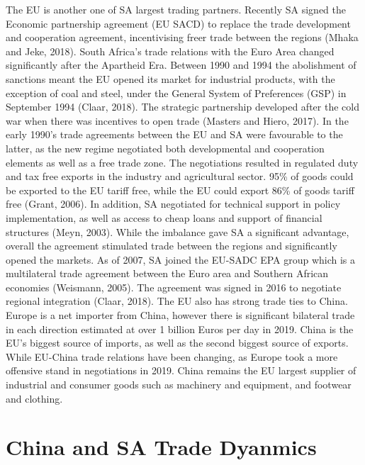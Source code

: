 \documentclass[11pt,preprint, authoryear]{elsarticle}
\numberwithin{equation}{section}
\numberwithin{figure}{section}
\numberwithin{table}{section}
\begin{document}
The EU is another one of SA largest trading partners. Recently SA signed
the Economic partnership agreement (EU SACD) to replace the trade
development and cooperation agreement, incentivising freer trade between
the regions (Mhaka and Jeke, 2018). South Africa's trade relations with
the Euro Area changed significantly after the Apartheid Era. Between
1990 and 1994 the abolishment of sanctions meant the EU opened its
market for industrial products, with the exception of coal and steel,
under the General System of Preferences (GSP) in September 1994 (Claar,
2018). The strategic partnership developed after the cold war when there
was incentives to open trade (Masters and Hiero, 2017). In the early
1990's trade agreements between the EU and SA were favourable to the
latter, as the new regime negotiated both developmental and cooperation
elements as well as a free trade zone. The negotiations resulted in
regulated duty and tax free exports in the industry and agricultural
sector. 95\% of goods could be exported to the EU tariff free, while the
EU could export 86\% of goods tariff free (Grant, 2006). In addition, SA
negotiated for technical support in policy implementation, as well as
access to cheap loans and support of financial structures (Meyn, 2003).
While the imbalance gave SA a significant advantage, overall the
agreement stimulated trade between the regions and significantly opened
the markets. As of 2007, SA joined the EU-SADC EPA group which is a
multilateral trade agreement between the Euro area and Southern African
economies (Weismann, 2005). The agreement was signed in 2016 to
negotiate regional integration (Claar, 2018). The EU also has strong
trade ties to China. Europe is a net importer from China, however there
is significant bilateral trade in each direction estimated at over 1
billion Euros per day in 2019. China is the EU's biggest source of
imports, as well as the second biggest source of exports. While EU-China
trade relations have been changing, as Europe took a more offensive
stand in negotiations in 2019. China remains the EU largest supplier of
industrial and consumer goods such as machinery and equipment, and
footwear and clothing.

\hypertarget{china-and-sa-trade-dyanmics}{%
\section{China and SA Trade
Dyanmics}\label{china-and-sa-trade-dyanmics}}
\end{document}
